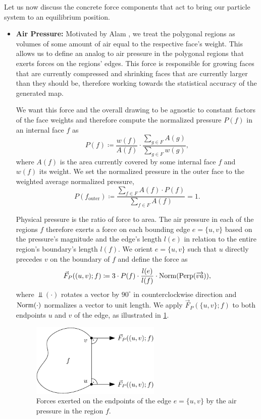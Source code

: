 Let us now discuss the concrete force components that act to bring our particle system to an equilibrium position.
%
\begin{itemize}
\item \textbf{Air Pressure:} %
Motivated by Alam \etal{} \cite{alam2013computing}, we treat the polygonal regions as volumes of some amount of air equal to the respective face's weight.
This allows us to define an analog to air pressure in the polygonal regions that exerts forces on the regions' edges.
This force is responsible for growing faces that are currently compressed and shrinking faces that are currently larger than they should be, therefore working towards the statistical accuracy of the generated map.

We want this force and the overall drawing to be agnostic to constant factors of the face weights and therefore compute the normalized pressure $P(f)$ in an internal face $f$ as
%
\begin{equation*}
	P(f) \coloneqq \frac{w(f)}{A(f)} \cdot \frac{\sum_{g \in F}{A(g)}}{\sum_{g \in F}{w(g)}},
\end{equation*}
%
where $A(f)$ is the area currently covered by some internal face $f$ and $w(f)$ its weight.
We set the normalized pressure in the outer face to the weighted average normalized pressure, \ie{}
%
\begin{equation*}
	P(f_\text{outer}) \coloneqq \frac{\sum_{f \in F}{A(f) \cdot P(f)}}{\sum_{f \in F}{A(f)}} = 1.
\end{equation*}

Physical pressure is the ratio of force to area.
The air pressure in each of the regions $f$ therefore exerts a force on each bounding edge $e = \{u,v\}$ based on the pressure's magnitude and the edge's length $l(e)$ in relation to the entire region's boundary's length $l(f)$.
We orient $e = \{u,v\}$ such that $u$ directly precedes $v$ on the boundary of $f$ and define the force as
%
\begin{equation}
	\vec{F}_P((u,v);f) \coloneqq
	3 \cdot P(f)\cdot\frac{l(e)}{l(f)}
	\cdot \operatorname{Norm}(\operatorname{Perp}(\overrightarrow{vu}))
	,
\end{equation}
%
where $\Perp(\cdot)$ rotates a vector by $90^\circ$ in counterclockwise direction and $\operatorname{Norm}(\cdot)$ normalizes a vector to unit length.
We apply $\vec{F}_P(\{u,v\};f)$ to both endpoints $u$ and $v$ of the edge, as illustrated in \cref{fig:drawing-forces-air-pressure}.

\begin{figure}[H]
	\centering
	\includegraphics[height=35mm]{Resources/Drawing-Forces-AirPressure.pdf}
	\caption{Forces exerted on the endpoints of the edge $e = \{u,v\}$ by the air pressure in the region $f$.}
	\label{fig:drawing-forces-air-pressure}
\end{figure}


\end{itemize}
